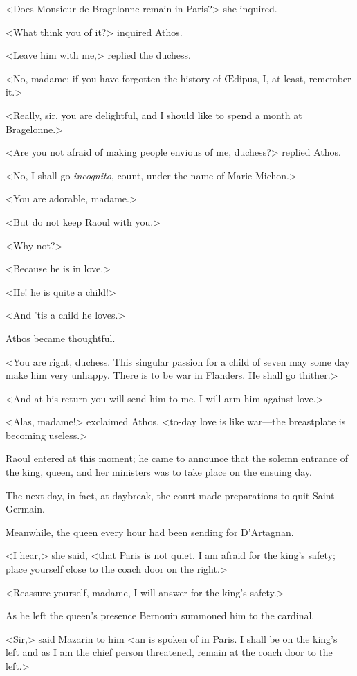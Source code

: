 <Does Monsieur de Bragelonne remain in Paris?> she inquired.

<What think you of it?> inquired Athos.

<Leave him with me,> replied the duchess.

<No, madame; if you have forgotten the history of Œdipus, I, at least, remember it.>

<Really, sir, you are delightful, and I should like to spend a month at Bragelonne.>

<Are you not afraid of making people envious of me, duchess?> replied Athos.

<No, I shall go \textit{incognito}, count, under the name of Marie Michon.>

<You are adorable, madame.>

<But do not keep Raoul with you.>

<Why not?>

<Because he is in love.>

<He! he is quite a child!>

<And 'tis a child he loves.>

Athos became thoughtful.

<You are right, duchess. This singular passion for a child of seven may some day make him very unhappy. There is to be war in Flanders. He shall go thither.>

<And at his return you will send him to me. I will arm him against love.>

<Alas, madame!> exclaimed Athos, <to-day love is like war—the breastplate is becoming useless.>

Raoul entered at this moment; he came to announce that the solemn entrance of the king, queen, and her ministers was to take place on the ensuing day.

The next day, in fact, at daybreak, the court made preparations to quit Saint Germain.

Meanwhile, the queen every hour had been sending for D'Artagnan.

<I hear,> she said, <that Paris is not quiet. I am afraid for the king's safety; place yourself close to the coach door on the right.>

<Reassure yourself, madame, I will answer for the king's safety.>

As he left the queen's presence Bernouin summoned him to the cardinal.

<Sir,> said Mazarin to him <an  is spoken of in Paris. I shall be on the king's left and as I am the chief person threatened, remain at the coach door to the left.>

